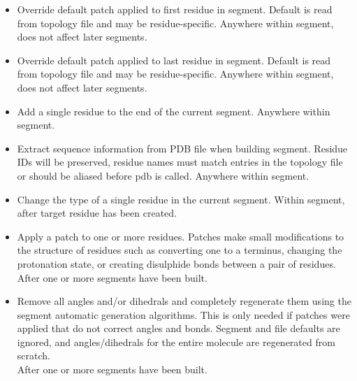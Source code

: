 \begin{itemize}
\item {}
{Override default patch applied to first residue in segment.
Default is read from topology file and may be residue-specific.}
{}
{Anywhere within segment, does not affect later segments.}

\item {}
{Override default patch applied to last residue in segment.
Default is read from topology file and may be residue-specific.}
{}
{Anywhere within segment, does not affect later segments.}

\item {}
{Add a single residue to the end of the current segment.}
{
}
{Anywhere within segment.}

\item {}
{Extract sequence information from PDB file when building segment.
Residue IDs will be preserved, residue names must match entries in
the topology file or should be aliased before pdb is called.}
{}
{Anywhere within segment.}

\item {}
{Change the type of a single residue in the current segment.}
{
}
{Within segment, after target residue has been created.}

\item {}
{Apply a patch to one or more residues.  Patches make small modifications to
the structure of residues such as converting one to a terminus, changing the
protonation state, or creating disulphide bonds between a pair of residues.}
{\\
}
{After one or more segments have been built.}

\item {}
{Remove all angles and/or dihedrals and completely regenerate them using
the segment automatic generation algorithms.  This is only needed if
patches were applied that do not correct angles and bonds.  Segment and
file defaults are ignored, and angles/dihedrals for the entire molecule
are regenerated from scratch.}
{\\
}
{After one or more segments have been built.}


\end{itemize}
